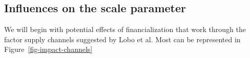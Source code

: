 


\subsection{Influences on the scale parameter}

We will begin with potential effects of financialization  that work through the factor supply channels suggested by Lobo et al. Most  can be represented in Figure~\ref{fig-impact-channels}

